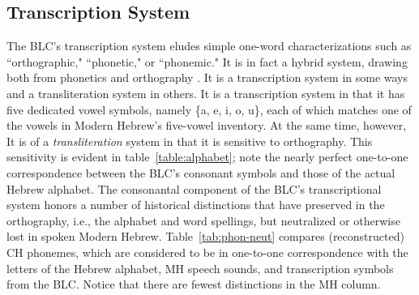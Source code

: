 \subsection{Transcription System}\label{sec:transcription}
The BLC's transcription system eludes simple one-word characterizations 
such as ``orthographic,"
``phonetic," or ``phonemic." It is in fact a hybrid system, drawing
both from phonetics and orthography \citep{albert-et-al:2013}. It is a transcription system
in some ways and a transliteration system in others.
It is a transcription system in that it has five dedicated vowel symbols, 
namely \{a, e, i, o, u\}, each of which matches one of the vowels in Modern 
Hebrew's five-vowel inventory. %
At the same time, however, 
It is  of a \emph{transliteration} system in that it is sensitive to orthography. This sensitivity is evident in 
table~\ref{table:alphabet}; note the nearly perfect one-to-one correspondence between the BLC's consonant 
symbols and those of the actual Hebrew alphabet. The consonantal component of the BLC's transcriptional system 
honors a number of historical distinctions that have preserved in the orthography, i.e., the alphabet and word 
spellings, but neutralized or otherwise lost in spoken Modern Hebrew. Table~\ref{tab:phon-neut} compares 
(reconstructed) CH phonemes, which are considered to be in one-to-one correspondence with the letters of 
the Hebrew alphabet, MH speech sounds, and transcription symbols from the BLC. Notice that there are fewest distinctions
in the MH column.




